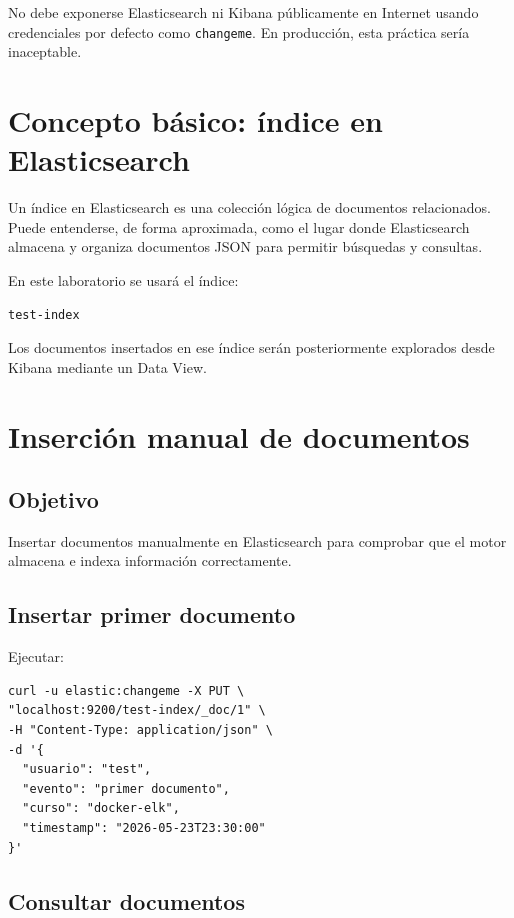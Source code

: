 \documentclass[
  coursetitle={Cómputo Nube y Tecnologías Emergentes},
  coursehours={96},
  coursedate={Verano 2026},
  doctype={Práctica},
  otherlangs={english,french},
  authorname={Lázaro},
  authorsurname={Bustio-Martínez},
  authortitle={PhD},
  role={Profesor Investigador},
  email={lbustio@inaoe.mx},
  phone={5559504000},
  ext={7459},
  institution={Instituto Nacional de Astrofísica, Óptica y Electrónica (INAOE)},
  department={Maestría en Ciencias en Tecnologías de Seguridad},
  address={Luis Enrique Erro 1, Sta. Ma. Tonantzintla, San Andrés Cholula, CP 72840, Puebla, México},
  margin={0.5in}
]{../../lbustio_lecture_notes}
\begin{document}
No debe exponerse Elasticsearch ni Kibana públicamente en Internet usando credenciales por defecto como \texttt{changeme}. En producción, esta práctica sería inaceptable.

\section{Concepto básico: índice en Elasticsearch}

Un índice en Elasticsearch es una colección lógica de documentos relacionados. Puede entenderse, de forma aproximada, como el lugar donde Elasticsearch almacena y organiza documentos JSON para permitir búsquedas y consultas.

En este laboratorio se usará el índice:

\begin{verbatim}
test-index
\end{verbatim}

Los documentos insertados en ese índice serán posteriormente explorados desde Kibana mediante un Data View.

\section{Inserción manual de documentos}

\subsection{Objetivo}

Insertar documentos manualmente en Elasticsearch para comprobar que el motor almacena e indexa información correctamente.

\subsection{Insertar primer documento}

Ejecutar:

\begin{lstlisting}
curl -u elastic:changeme -X PUT \
"localhost:9200/test-index/_doc/1" \
-H "Content-Type: application/json" \
-d '{
  "usuario": "test",
  "evento": "primer documento",
  "curso": "docker-elk",
  "timestamp": "2026-05-23T23:30:00"
}'
\end{lstlisting}

\subsection{Consultar documentos}
\end{document}
